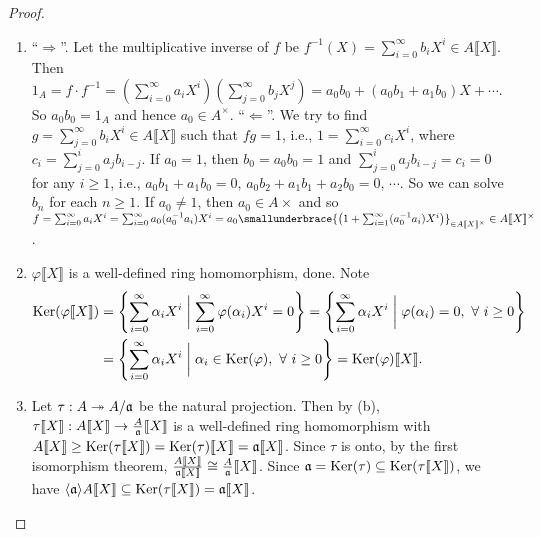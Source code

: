\begin{proof}
    \begin{enumerate}
        \item 
            ``$\Rightarrow$''. Let the multiplicative inverse of $f$ be $f^{-1}(X) = \sum_{i=0}^\infty b_iX^i \in A\llbracket X \rrbracket$. Then $1_A = f \cdot f^{-1} = (\sum_{i=0}^\infty a_iX^i)(\sum_{j=0}^\infty b_jX^j) = a_0b_0 + (a_0b_1 + a_1b_0)X + \cdots$. So $a_0b_0 = 1_A$ and hence $a_0 \in A^\times$. ``$\Leftarrow$''. We try to find $g = \sum_{j=0}^\infty b_iX^i \in A\llbracket X \rrbracket$ such that $fg = 1$, i.e., $1 = \sum_{i=0}^\infty c_iX^i$, where $c_i = \sum_{j=0}^ia_jb_{i-j}$. If $a_0 = 1$, then $b_0 = a_0b_0 = 1$ and $\sum_{j=0}^i a_jb_{i-j} = c_i = 0$ for any $i \geq 1$, i.e., $a_0b_1 + a_1b_0 = 0$, $a_0b_2 + a_1b_1 + a_2b_0= 0$, $\cdots$. So we can solve $b_n$ for each $n \geq 1$.  If $a_0 \neq 1$, then $a_0 \in A\times $ and so $f = \sum_{i=0}^\infty a_iX^i = \sum_{i=0}^\infty a_0(a_0^{-1}a_i)X^i = a_0 \smallunderbrace{\left(1+\sum_{i=1}^\infty (a_0^{-1}a_i)X^i\right)}_{\in A\llbracket X \rrbracket^\times} \in A\llbracket X \rrbracket^\times$.
        \item
            $\varphi \llbracket X \rrbracket$ is a well-defined ring homomorphism, done. Note \\
            \begin{align*}
                \operatorname{Ker}(\varphi \llbracket X \rrbracket) &= \left\{\sum_{i=0}^\infty \alpha_i X^i \mathrel{\bigg |} \sum_{i=0}^\infty \varphi(\alpha_i)X^i = 0 \right\} = \left\{\sum_{i=0}^\infty \alpha_i X^i \mathrel{\bigg |} \varphi(\alpha_i) = 0, \ \forall \  i \geq 0\right\} \\
                                                      &= \left\{\sum_{i=0}^\infty \alpha_i X^i \mathrel{\bigg |} \alpha_i \in \operatorname{Ker}(\varphi), \ \forall \  i \geq 0 \right\} = \operatorname{Ker}(\varphi)\llbracket X \rrbracket.
            \end{align*}
        \item 
            Let $\tau: A \twoheadrightarrow A/\mathfrak{a}$ be the natural projection. Then by (b), $\tau \llbracket X \rrbracket: A\llbracket X \rrbracket \to \frac{A}{\mathfrak{a}}\llbracket X \rrbracket$ is a well-defined ring homomorphism with $A\llbracket X \rrbracket \geq \operatorname{Ker}(\tau \llbracket X \rrbracket) = \operatorname{Ker}(\tau) \llbracket X \rrbracket = \mathfrak{a} \llbracket X \rrbracket$. Since $\tau$ is onto, by the first isomorphism theorem, $\frac{A\llbracket X \rrbracket}{\mathfrak{a} \llbracket X \rrbracket} \cong \frac{A}{\mathfrak{a}}\llbracket X \rrbracket$. Since $\mathfrak{a} = \operatorname{Ker}(\tau) \subseteq \operatorname{Ker}(\tau \llbracket X \rrbracket)$, we have $\langle \mathfrak{a} \rangle A \llbracket X \rrbracket \subseteq \operatorname{Ker}(\tau \llbracket X \rrbracket) = \mathfrak{a} \llbracket X \rrbracket$. \\

\end{enumerate}
\end{proof}
